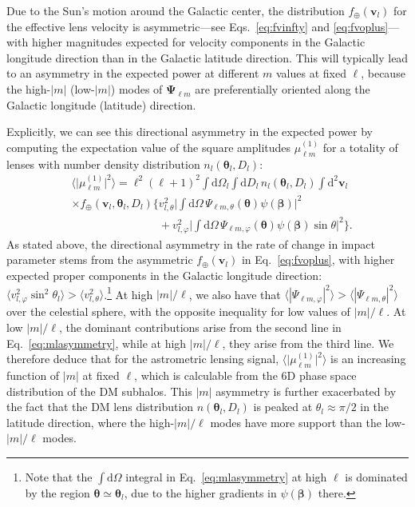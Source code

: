 \documentclass[prd,aps,10pt,nofootinbib,twocolumn,superscriptaddress,preprintnumbers,balancelastpage,longbibliography]{revtex4-1}
\newcommand{\vect}[1]{\boldsymbol{\mathbf{#1}}}
\newcommand{\dd}{\mathrm{d}}
\begin{document}
Due to the Sun's motion around the Galactic center, the distribution $f_\oplus(\vect{v}_l)$ for the effective lens velocity is asymmetric---see Eqs.~\ref{eq:fvinfty} and \ref{eq:fvoplus}---with higher magnitudes expected for velocity components in the Galactic longitude direction than in the Galactic latitude direction. This will typically lead to an asymmetry in the expected power at different $m$ values at fixed $\ell$, because the high-$|m|$ (low-$|m|$) modes of $\vect{\Psi}_{\ell m}$ are preferentially oriented along the Galactic longitude (latitude) direction. 

Explicitly, we can see this directional asymmetry in the expected power by computing the expectation value of the square amplitudes $\mu_{\ell m}^{(1)}$ for a totality of lenses with number density distribution $n_l(\vect{\theta}_l, D_l)$:
\begin{align}
& \big \langle \big|\mu_{\ell m}^{(1)}\big|^2\big\rangle  = \ell^2 (\ell + 1)^2 \int \dd \Omega_l \int \dd D_l \,
 n_l(\vect{\theta}_l,D_l)\int \dd^2 \vect{v}_l  \nonumber \\
& \times  f_\oplus(\vect{v}_l,\vect{\theta}_l,D_l)  \bigg\lbrace v_{l,\theta}^2 \bigg| \int \dd\Omega\, \Psi_{\ell m,\theta}(\vect{\theta}) \psi(\vect{\beta})\bigg|^2 \label{eq:mlasymmetry}\\
& \phantom{\times f_\oplus(\vect{v}_l,\vect{\theta}_l,D_l)  \bigg\lbrace} +  v_{l,\varphi}^2  \bigg| \int \dd\Omega\, \Psi_{\ell m,\varphi}(\vect{\theta}) \psi(\vect{\beta}) \sin \theta  \bigg|^2 \bigg\rbrace. \nonumber
\end{align}
As stated above, the directional asymmetry in the rate of change in impact parameter stems from the asymmetric $f_\oplus(\vect{v}_l)$ in Eq.~\ref{eq:fvoplus}, with higher expected proper components in the Galactic longitude direction: $\langle v_{l,\varphi}^2 \sin^2 \theta_l \rangle > \langle v_{l,\theta}^2 \rangle $.\footnote{Note that the $\int \dd \Omega$ integral in Eq.~\ref{eq:mlasymmetry} at high $\ell$ is dominated by the region $\vect{\theta} \simeq \vect{\theta}_l$, due to the higher gradients in $\psi(\vect{\beta})$ there.} At high $|m|/\ell$, we also have that $\langle |\Psi_{\ell m,\varphi}|^2 \rangle > \langle |\Psi_{\ell m,\theta}|^2 \rangle$ over the celestial sphere, with the opposite inequality for low values of $|m|/\ell$. At low $|m|/\ell$, the dominant contributions arise from the second line in Eq.~\ref{eq:mlasymmetry}, while at high $|m|/\ell$, they arise from the third line. We therefore deduce that for the astrometric lensing signal, $\big \langle \big|\mu_{\ell m}^{(1)}\big|^2\big\rangle$ is an increasing function of $|m|$ at fixed $\ell$, which is calculable from the 6D phase space distribution of the DM subhalos. This $|m|$ asymmetry is further exacerbated by the fact that the DM lens distribution $n(\vect{\theta}_l,D_l)$ is peaked at $\theta_l \approx \pi / 2$ in the latitude direction, where the high-$|m|/\ell$ modes have more support than the low-$|m|/\ell$ modes.
\end{document}
